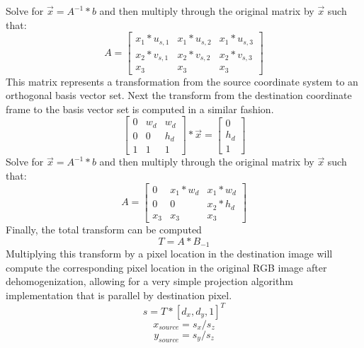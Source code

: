 Solve for $\vec{x}= A^{-1}*b$ and then multiply through the original matrix by $\vec{x}$ such that:
$$A = \begin{bmatrix}
  x_1*u_{s,1} & x_1*u_{s,2} & x_1*u_{s,3} \\
  x_2*v_{s,1} & x_2*v_{s,2} & x_2*v_{s,3} \\
  x_3 & x_3 & x_3 
 \end{bmatrix}$$
This matrix represents a transformation from the source coordinate system to an orthogonal basis vector set. Next the transform from the destination coordinate frame to the basis vector set is computed in a similar fashion.
$$\begin{bmatrix}
  0 & w_d & w_d \\
  0 & 0 & h_d \\
  1 & 1 & 1 
 \end{bmatrix} * \vec{x} = \begin{bmatrix}
  0 \\
  h_d \\
  1
 \end{bmatrix}$$
Solve for $\vec{x}= A^{-1}*b$ and then multiply through the original matrix by $\vec{x}$ such that:
$$A = \begin{bmatrix}
  0 & x_1*w_d & x_1*w_d \\
  0 & 0 & x_2*h_d \\
  x_3 & x_3 & x_3 
 \end{bmatrix}$$
Finally, the total transform can be computed $$T=A*B_{-1}$$
Multiplying this transform by a pixel location in the destination image will compute the corresponding pixel location in the original RGB image after dehomogenization, allowing for a very simple projection algorithm implementation that is parallel by destination pixel.
$$s = T*[d_x,d_y,1]^T$$
$$x_{source} = s_x/s_z$$
$$y_{source} = s_y/s_z$$

